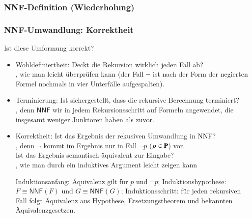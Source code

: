 \documentclass[aspectratio=1610,onlymath]{beamer}
\begin{document}
\begin{frame}\frametitle{NNF-Definition (Wiederholung)}


\end{frame}

\begin{frame}\frametitle{NNF-Umwandlung: Korrektheit}

Ist diese Umformung korrekt?
\begin{itemize}
\item \alert{Wohldefiniertheit:} Deckt die Rekursion wirklich jeden Fall ab?\\\pause
	, wie man leicht überprüfen kann (der Fall $\neg$ ist nach der Form der negierten Formel nochmals in vier Unterfälle aufgespalten).\pause
\item \alert{Terminierung:} Ist sichergestellt, dass die rekursive Berechnung terminiert?\\\pause
	, denn $\textsf{NNF}$ wir in jedem Rekursionsschritt auf Formeln angewendet, die insgesamt weniger Junktoren haben als zuvor.\pause
\item \alert{Korrektheit:} Ist das Ergebnis der rekusiven Umwandlung in NNF?\\\pause
	, denn $\neg$ kommt im Ergebnis nur in Fall $\neg p$ ($p\in\textbf{\textcolor{black}{P}}$) vor.\\\pause
	Ist das Ergebnis semantisch äquivalent zur Eingabe?\\\pause
	, wie man durch ein induktives Argument leicht zeigen kann\\
	{\tiny Induktionsanfang: Äquivalenz gilt für $p$ und $\neg p$; Induktionshypothese: $F\equiv \textsf{NNF}(F)$ und $G\equiv \textsf{NNF}(G)$; Induktionsschritt: für jeden rekursiven Fall folgt Äquivalenz aus Hypothese, Ersetzungstheorem und bekannten Äquivalenzgesetzen.
	
	}
\end{itemize}\pause


\end{frame}
\end{document}
